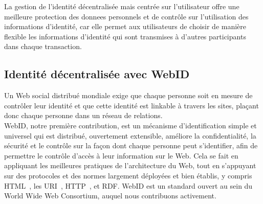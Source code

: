 \documentclass[a4paper]{article}
\begin{document}
La gestion de l'identité décentralisée mais centrée sur l'utilisateur offre une meilleure protection des donnees personnels et de contrôle sur l'utilisation des informations d'identité, car elle permet aux utilisateurs de choisir de manière flexible les informations d'identité qui sont transmises à d'autres participants dans chaque transaction.\\

\subsection{Identité décentralisée avec WebID}
\label{sec:webid}
Un Web social distribué mondiale exige que chaque personne soit en mesure de contrôler leur identité et que cette identité est linkable à travers les sites, plaçant donc chaque personne dans un réseau de relations.\\


WebID, notre première contribution, est un mécanisme d'identification simple et universel qui est distribué, ouvertement extensible, améliore la confidentialité, la sécurité et le contrôle sur la façon dont chaque personne peut s'identifier, afin de permettre le contrôle d'accès à leur information sur le Web. Cela se fait en appliquant les meilleures pratiques de l'architecture du Web, tout en s'appuyant sur des protocoles et des normes largement déployées et bien établis, y compris HTML~\cite{berners1995hypertext}, les URI~\cite{berners1998uniform}, HTTP~\cite{berners1996hypertext}, et RDF. WebID est un standard ouvert au sein du World Wide Web Consortium, auquel nous contribuons activement.\\
\end{document}
